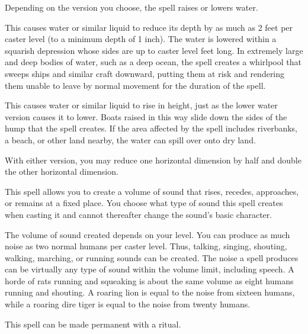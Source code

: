 \spellrng{\rngfar}
\begin{spelleffect}
  Depending on the version you choose, the  spell raises or lowers water.
  \par {} This causes water or similar liquid to reduce its depth by as much as 2 feet per caster level (to a minimum depth of 1 inch). The water is lowered within a squarish depression whose sides are up to caster level  feet long. In extremely large and deep bodies of water, such as a deep ocean, the spell creates a whirlpool that sweeps ships and similar craft downward, putting them at risk and rendering them unable to leave by normal movement for the duration of the spell.
  \par {} This causes water or similar liquid to rise in height, just as the lower water version causes it to lower. Boats raised in this way slide down the sides of the hump that the spell creates. If the area affected by the spell includes riverbanks, a beach, or other land nearby, the water can spill over onto dry land.
\end{spelleffect}
\begin{spellnotes}
  With either version, you may reduce one horizontal dimension by half and double the other horizontal dimension.
\end{spellnotes}

\spellrng{\rngclose}
\begin{spelleffect}
  This spell allows you to create a volume of sound that rises, recedes, approaches, or remains at a fixed place. You choose what type of sound this spell creates when casting it and cannot thereafter change the sound's basic character.
  \par The volume of sound created depends on your level. You can produce as much noise as two normal humans per caster level. Thus, talking, singing, shouting, walking, marching, or running sounds can be created. The noise a  spell produces can be virtually any type of sound within the volume limit, including speech. A horde of rats running and squeaking is about the same volume as eight humans running and shouting. A roaring lion is equal to the noise from sixteen humans, while a roaring dire tiger is equal to the noise from twenty humans.
\end{spelleffect}
\begin{spellnotes}
This spell can be made permanent with a  ritual.
\end{spellnotes}

